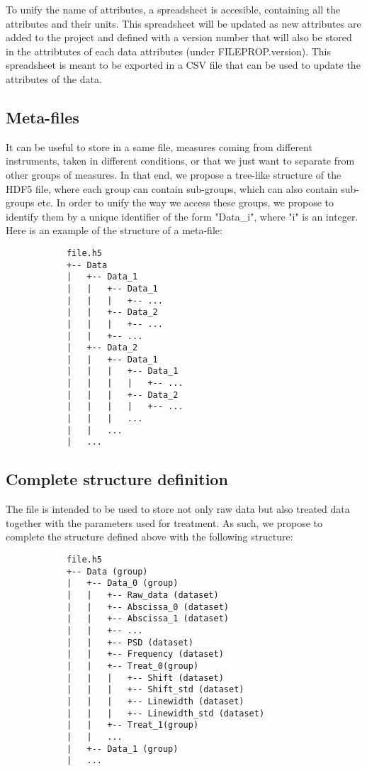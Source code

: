 \documentclass{article}
\begin{document}
        To unify the name of attributes, a spreadsheet is accesible, containing all the attributes and their units. This spreadsheet will be updated as new attributes are added to the project and defined with a version number that will also be stored in the attribtutes of each data attributes (under FILEPROP.version). This spreadsheet is meant to be exported in a CSV file that can be used to update the attributes of the data.

    \subsection{Meta-files}
        It can be useful to store in a same file, measures coming from different instruments, taken in different conditions, or that we just want to separate from other groups of measures. In that end, we propose a tree-like structure of the HDF5 file, where each group can contain sub-groups, which can also contain sub-groups etc. In order to unify the way we access these groups, we propose to identify them by a unique identifier of the form "Data\_i", where "i" is an integer. Here is an example of the structure of a meta-file:

        \begin{verbatim}
            file.h5
            +-- Data
            |   +-- Data_1
            |   |   +-- Data_1
            |   |   |   +-- ...
            |   |   +-- Data_2
            |   |   |   +-- ...
            |   |   +-- ...
            |   +-- Data_2
            |   |   +-- Data_1
            |   |   |   +-- Data_1
            |   |   |   |   +-- ...
            |   |   |   +-- Data_2
            |   |   |   |   +-- ...
            |   |   |   ...
            |   |   ...
            |   ...
        \end{verbatim}

    \subsection{Complete structure definition}
        The file is intended to be used to store not only raw data but also treated data together with the parameters used for treatment. As such, we propose to complete the structure defined above with the following structure:

        \begin{verbatim}
            file.h5
            +-- Data (group)
            |   +-- Data_0 (group)
            |   |   +-- Raw_data (dataset)
            |   |   +-- Abscissa_0 (dataset)
            |   |   +-- Abscissa_1 (dataset)
            |   |   +-- ...
            |   |   +-- PSD (dataset)
            |   |   +-- Frequency (dataset)
            |   |   +-- Treat_0(group)
            |   |   |   +-- Shift (dataset)
            |   |   |   +-- Shift_std (dataset)
            |   |   |   +-- Linewidth (dataset)
            |   |   |   +-- Linewidth_std (dataset)
            |   |   +-- Treat_1(group)
            |   |   ...
            |   +-- Data_1 (group)
            |   ...
        \end{verbatim}
\end{document}
